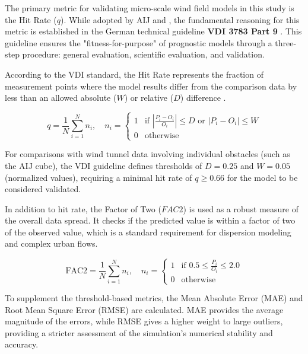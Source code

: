 The primary metric for validating micro-scale wind field models in this study is the Hit Rate ($q$). While adopted by AIJ and \textcite{Okaze2021LES}, the fundamental reasoning for this metric is established in the German technical guideline \textbf{VDI 3783 Part 9} \parencite{VDI2015}. This guideline ensures the "fitness-for-purpose" of prognostic models through a three-step procedure: general evaluation, scientific evaluation, and validation.

According to the VDI standard, the Hit Rate represents the fraction of measurement points where the model results differ from the comparison data by less than an allowed absolute ($W$) or relative ($D$) difference \parencite{Meroney2016}.

\begin{equation}
q = \frac{1}{N} \sum_{i=1}^{N} n_i, \quad n_i = 
    \begin{cases} 
        1 & \text{if } \left| \frac{P_i - O_i}{O_i} \right| \le D \text{ or } |P_i - O_i| \le W \\ 
        0 & \text{otherwise} 
    \end{cases}
\end{equation}

For comparisons with wind tunnel data involving individual obstacles (such as the AIJ cube), the VDI guideline defines thresholds of $D = 0.25$ and $W = 0.05$ (normalized values), requiring a minimal hit rate of $q \ge 0.66$ for the model to be considered validated.

In addition to hit rate, the Factor of Two ($FAC2$) is used as a robust measure of the overall data spread. It checks if the predicted value is within a factor of two of the observed value, which is a standard requirement for dispersion modeling and complex urban flows.

\begin{equation}
\text{FAC2} = \frac{1}{N} \sum_{i=1}^{N} n_i, \quad n_i = 
    \begin{cases} 
        1 & \text{if } 0.5 \le \frac{P_i}{O_i} \le 2.0 \\ 
        0 & \text{otherwise} 
    \end{cases}
\end{equation}

To supplement the threshold-based metrics, the Mean Absolute Error (MAE) and Root Mean Square Error (RMSE) are calculated. MAE provides the average magnitude of the errors, while RMSE gives a higher weight to large outliers, providing a stricter assessment of the simulation's numerical stability and accuracy.

